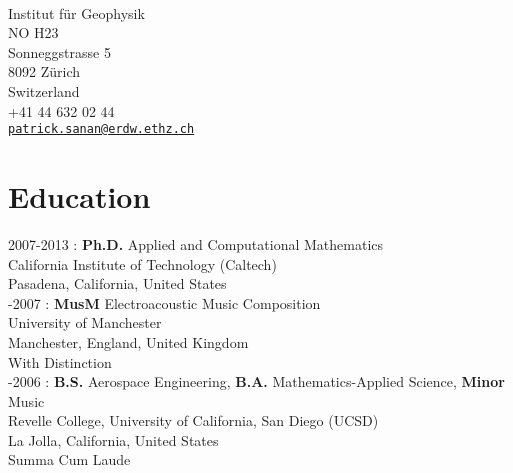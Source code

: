 



\thispagestyle{firstpagestyle}
\pagestyle{fancy}

\begin{center}
\vspace{10px}{\Large Patrick Sanan}\\
\vspace{10px}
{\small Institut f\"{u}r Geophysik\\NO H23\\Sonneggstrasse 5\\8092 Z\"{u}rich\\Switzerland}\\
{+41 44 632 02 44} \\
\vspace{5pt}
{\tt \href{mailto:patrick.sanan@gmail.com}{patrick.sanan@erdw.ethz.ch}}\\
\vspace{10pt}
\end{center}

\section*{Education}

2007-2013 : \textbf{Ph.D.} Applied and Computational Mathematics\\
California Institute of Technology (Caltech)\\
Pasadena, California, United States \\

-2007 : \textbf{MusM} Electroacoustic Music Composition\\
University of Manchester\\
Manchester, England, United Kingdom\\
With Distinction \\

-2006 : \textbf{B.S.} Aerospace Engineering, \textbf{B.A.} Mathematics-Applied Science, \textbf{Minor} Music\\
Revelle College, University of California, San Diego (UCSD)\\
La Jolla, California, United States\\
Summa Cum Laude\\

